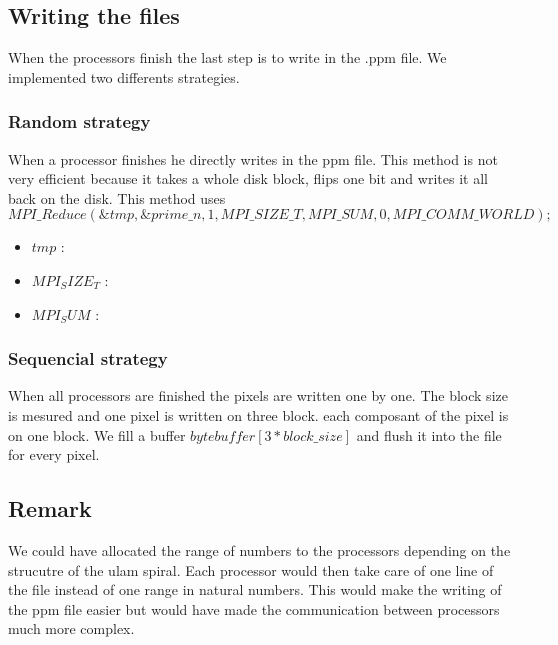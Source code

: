 \subsection{Writing the files}
When the processors finish the last step is to write in the .ppm file. We implemented two differents strategies.

\subsubsection{Random strategy}
When a processor finishes he directly writes in the ppm file. This method is not very efficient because it takes a whole disk block, flips one bit and writes it all back on the disk. This method uses $$MPI\_Reduce(\&tmp, \&prime\_n, 1, MPI\_SIZE\_T, MPI\_SUM, 0, MPI\_COMM\_WORLD);$$  

\begin{itemize}

	\item{$tmp$ :}
	\item{$MPI_SIZE_T$ :}
	\item{$MPI_SUM$ :} 

\end{itemize}

\subsubsection{Sequencial strategy}
When all processors are finished the pixels are written one by one. The block size is mesured and one pixel is written on three block. each composant of the pixel is on one block. We fill a buffer $byte buffer[3*block\_size]$ and flush it into the file for every pixel.

\subsection{Remark}
We could have allocated the range of numbers to the processors depending on the strucutre of the ulam spiral. Each processor would then take care of one line of the file instead of one range in natural numbers. This would make the writing of the ppm file easier but would have made the communication between processors much more complex.